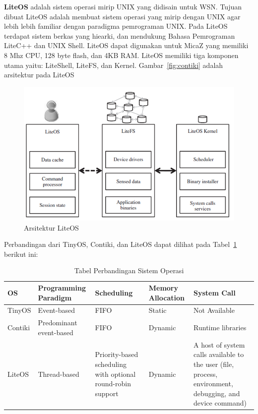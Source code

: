 \documentclass[a4paper,twoside]{article}
\begin{document}
\begin{enumerate}
\textbf{LiteOS} adalah sistem operasi mirip UNIX yang didisain untuk WSN. Tujuan dibuat LiteOS adalah membuat sistem operasi yang mirip dengan UNIX agar lebih lebih familiar dengan paradigma pemrograman UNIX. Pada LiteOS terdapat sistem berkas yang hiearki, dan mendukung Bahasa Pemrograman LiteC++ dan UNIX Shell. LiteOS dapat digunakan untuk MicaZ yang memiliki 8 Mhz CPU, 128 byte flash, dan 4KB RAM. LiteOS memiliki tiga komponen utama yaitu: LiteShell, LiteFS, dan Kernel. Gambar~\ref{fig:contiki} adalah arsitektur pada LiteOS
\begin{figure} [H]
	\centering  
	\includegraphics[scale=0.4]{Gambar/liteOS}  
	\caption[Arsitektur LiteOS]{Arsitektur LiteOS} 
	\label{fig:liteOS} 
\end{figure}

Perbandingan dari TinyOS, Contiki, dan LiteOS dapat dilihat pada Tabel~\ref{tab:perbandinganOS} berikut ini:
\begin{table}[H] %
	\centering 
	\caption{Tabel Perbandingan Sistem Operasi}
	\label{tab:perbandinganOS}
	\begin{tabular}{| p{1.6cm} | p{3.8cm} | p{2.5cm} | p{3cm} | p{4cm} |}
		\toprule
		OS & Programming Paradigm & Scheduling & Memory Allocation & System Call\\ 
		
		\midrule
		TinyOS & Event-based & FIFO & Static & Not Available\\
		Contiki & Predominant event-based & FIFO & Dynamic & Runtime libraries\\ 
		LiteOS & Thread-based & Priority-based scheduling with optional round-robin support & Dynamic & A host of system calls available to the user (file, process, environment, debugging, and device command) 	\\ 


\end{tabular}
\end{table}
\end{enumerate}
\end{document}
